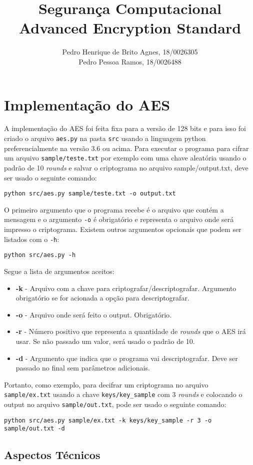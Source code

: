\documentclass[12pt]{article}
\title{\textbf{Segurança Computacional\\ \Large{Advanced Encryption Standard}}}
\author{Pedro Henrique de Brito Agnes, 18/0026305 \\
Pedro Pessoa Ramos, 18/0026488}
\affil{Dep. Ciência da Computação - Universidade de Brasília (UnB) \vspace{-2ex}}
\date{}
\begin{document}
\maketitle

\section{Implementação do AES}
A implementação do AES foi feita fixa para a versão de 128 bits e para isso foi criado o arquivo \texttt{aes.py} na pasta \texttt{src} usando a linguagem python preferencialmente na versão 3.6 ou acima. Para executar o programa para cifrar um arquivo \texttt{sample/teste.txt} por exemplo com uma chave aleatória usando o padrão de 10 \textit{rounds} e salvar o criptograma no arquivo sample/output.txt, deve ser usado o seguinte comando:

\begin{lstlisting}
python src/aes.py sample/teste.txt -o output.txt
\end{lstlisting}

O primeiro argumento que o programa recebe é o arquivo que contém a mensagem e o argumento \texttt{-o} é obrigatório e representa o arquivo onde será impresso o criptograma. Existem outros argumentos opcionais que podem ser listados com o \texttt{-h}:

\begin{lstlisting}
python src/aes.py -h
\end{lstlisting}

Segue a lista de argumentos aceitos:
\begin{itemize}
    \item \textbf{-k} - Arquivo com a chave para criptografar/descriptografar. Argumento obrigatório se for acionada a opção para descriptografar.
    \item \textbf{-o} - Arquivo onde será feito o output. Obrigatório.
    \item \textbf{-r} - Número positivo que representa a quantidade de \textit{rounds} que o AES irá usar. Se não passado um valor, será usado o padrão de 10.
    \item \textbf{-d} - Argumento que indica que o programa vai descriptografar. Deve ser passado no final sem parâmetros adicionais.
\end{itemize}

Portanto, como exemplo, para decifrar um criptograma no arquivo \texttt{sample/ex.txt} usando a chave \texttt{keys/key\_sample} com 3 \textit{rounds} e colocando o output no arquivo \texttt{sample/out.txt}, pode ser usado o seguinte comando:

\begin{lstlisting}
python src/aes.py sample/ex.txt -k keys/key_sample -r 3 -o sample/out.txt -d
\end{lstlisting}

\subsection{Aspectos Técnicos}
\end{document}
